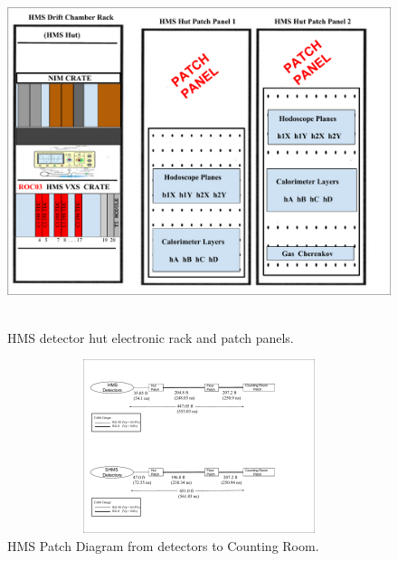 \documentclass[11pt]{article}
\begin{document}
\begin{figure}[h!]
  \centering
  \includegraphics[width=5.0in, height=4.0in]{../HMS_Hut_Rack.pdf}
  \caption{HMS detector hut electronic rack and patch panels.}
  \label{fig:hms_hut_rack}
\end{figure}

\begin{figure}[h]
  \centering
  \includegraphics[width=6.0in, height=2.0in]{../HMS_patch.pdf}
  \caption{HMS Patch Diagram from detectors to Counting Room.}
  \label{fig:hms_patch}
\end{figure}
\end{document}
